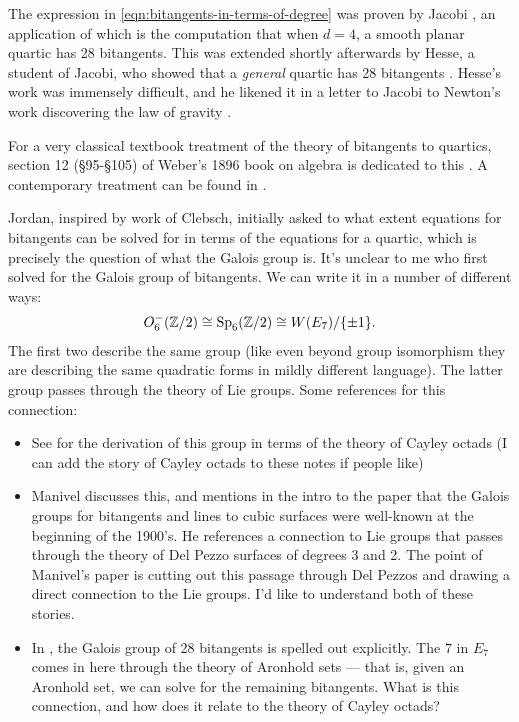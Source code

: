 \documentclass[11pt]{amsart}
\begin{document}
The expression in \autoref{eqn:bitangents-in-terms-of-degree} was proven by Jacobi \cite{Jacobi1850}, an application of which is the computation that when $d=4$, a smooth planar quartic has 28 bitangents. This was extended shortly afterwards by Hesse, a student of Jacobi, who showed that a \textit{general} quartic has 28 bitangents \cite{Hesse1855}. Hesse's work was immensely difficult, and he likened it in a letter to Jacobi to Newton's work discovering the law of gravity \cite[p.~165]{Gray-worlds}.

For a very classical textbook treatment of the theory of bitangents to quartics, section 12 (\S95-\S105) of Weber's 1896 book on algebra is dedicated to this \cite[\S95-\S105]{Weber1896}. A contemporary treatment can be found in \cite[\S6.1]{Dolgachev}.

Jordan, inspired by work of Clebsch, initially asked to what extent equations for bitangents can be solved for in terms of the equations for a quartic, which is precisely the question of what the Galois group is. It's unclear to me who first solved for the Galois group of bitangents. We can write it in a number of different ways:
\begin{align*}
    O_6^-(\mathbb{Z}/2) \cong \mathrm{Sp}_6(\mathbb{Z}/2) \cong W(E_7)/\{\pm 1\}.
\end{align*}
The first two describe the same group (like even beyond group isomorphism they are describing the same quadratic forms in mildly different language). The latter group passes through the theory of Lie groups. Some references for this connection:
\begin{itemize}
    \item See \cite[Theorem~9]{DolgachevOrtland} for the derivation of this group in terms of the theory of Cayley octads (I can add the story of Cayley octads to these notes if people like)
    \item Manivel \cite{Manivel2006} discusses this, and mentions in the intro to the paper that the Galois groups for bitangents and lines to cubic surfaces were well-known at the beginning of the 1900's. He references a connection to Lie groups that passes through the theory of Del Pezzo surfaces of degrees 3 and 2. The point of Manivel's paper is cutting out this passage through Del Pezzos and drawing a direct connection to the Lie groups. I'd like to understand both of these stories.
    \item In \cite[p.~367]{MillerBlichfeldtDickson}, the Galois group of 28 bitangents is spelled out explicitly. The $7$ in $E_7$ comes in here through the theory of Aronhold sets --- that is, given an Aronhold set, we can solve for the remaining bitangents. What is this connection, and how does it relate to the theory of Cayley octads?
\end{itemize}
\end{document}
